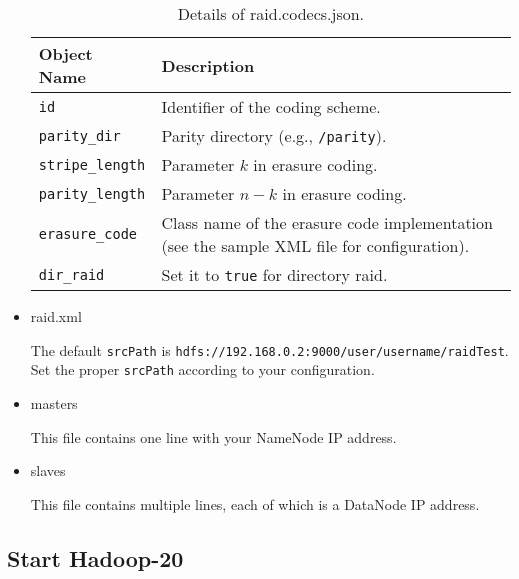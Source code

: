 \documentclass[letterpaper,12pt]{article}
\begin{document}
\begin{itemize}
\begin{table}[!ht]
\centering
\renewcommand{\arraystretch}{1.1}
\small
\begin{tabular}{|p{2in}|p{3.5in}|}
\hline
{\bf Object Name} & {\bf Description} \\
\hline
{\tt id} & Identifier of the coding scheme. \\
\hline
{\tt parity\_dir} & Parity directory (e.g., {\tt /parity}).\\
\hline
{\tt stripe\_length} & Parameter $k$ in erasure coding. \\
\hline
{\tt parity\_length} & Parameter $n-k$ in erasure coding. \\
\hline
{\tt erasure\_code} & Class name of the erasure code implementation (see the
sample XML file for configuration). \\
\hline
{\tt dir\_raid} & Set it to {\tt true} for directory raid.\\
\hline
\end{tabular}
\caption{Details of raid.codecs.json.}
\label{tab:raidcodecs}
\end{table}

\item raid.xml

The default {\tt srcPath} is
{\tt hdfs://192.168.0.2:9000/user/username/raidTest}.  Set the proper
{\tt srcPath} according to your configuration.

\item masters

This file contains one line with your NameNode IP address.
\begin{center}
\noindent{}
\end{center}

\item slaves

This file contains multiple lines, each of which is a DataNode IP address.

\begin{center}
\noindent{}
\end{center}

\end{itemize}

\subsection{Start Hadoop-20}
\end{document}
